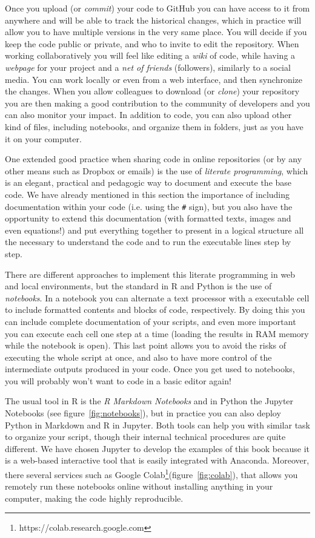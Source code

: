 Once you upload (or \textit{commit}) your code to GitHub you can have access to it from anywhere and will be able to track the historical changes, which in practice will allow you to have multiple versions in the very same place. You will decide if you keep the code public or private, and who to invite to edit the repository. When working collaboratively you will feel like editing a \textit{wiki} of code, while having a \textit{webpage} for your project and a \textit{net of friends} (followers), similarly to a social media. You can work locally or even from a web interface, and then synchronize the changes. When you allow colleagues to download (or \textit{clone}) your repository you are then making a good contribution to the community of developers and you can also monitor your impact. In addition to code, you can also upload other kind of files, including notebooks, and organize them in folders, just as you have it on your computer.

One extended good practice when sharing code in online repositories (or by any other means such as Dropbox or emails) is the use of \textit{literate programming}, which is an elegant, practical and pedagogic way to document and execute the base code. We have already mentioned in this section the importance of including documentation within your code (i.e. using the \texttt{\#} sign), but you also have the opportunity to extend this documentation (with formatted texts, images and even equations!) and put everything together to present in a logical structure all the necessary to understand the code and to run the executable lines step by step. 

There are different approaches to implement this literate programming in web and local environments, but the standard in R and Python is the use of \textit{notebooks}. In a notebook you can alternate a text processor with a executable cell to include formatted contents and blocks of code, respectively. By doing this you can include complete documentation of your scripts, and even more important you can execute each cell one step at a time (loading the results in RAM memory while the notebook is open). This last point allows you to avoid the risks of executing the whole script at once, and also to have more control of the intermediate outputs produced in your code. Once you get used to notebooks, you will probably won't want to code in a basic editor again!

The usual tool in R is the \textit{R Markdown Notebooks} and in Python the Jupyter Notebooks (see figure~\ref{fig:notebooks}), but in practice you can also deploy Python in Markdown and R in Jupyter. Both tools can help you with similar task to organize your script, though their internal technical procedures are quite different. We have chosen Jupyter to develop the examples of this book because it is a web-based interactive tool that is easily integrated with Anaconda. Moreover, there several services such as Google Colab\footnote{https://colab.research.google.com}(figure~\ref{fig:colab}), that allows you remotely run these notebooks online without installing anything in your computer, making the code highly reproducible.

